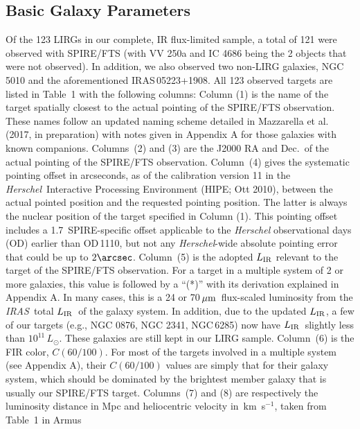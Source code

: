 \documentclass[preprint]{aastex}
\newcommand{\um}{\mbox{$\,\mu{\rm m}$}}
\newcommand{\kms}{\mbox{\,km~s$^{-1}$}}
\newcommand{\IRAS}{{\it IRAS}}
\newcommand{\Herschel}{{\it Herschel}}
\newcommand{\LIR}{\mbox{$L_{\rm IR}$}}
\begin{document}
\subsection{Basic Galaxy Parameters} \label{sec2.2}

Of the 123 LIRGs in our complete, IR flux-limited sample,  a total of 121 were observed 
with SPIRE/FTS (with VV 250a and IC 4686 being the 2 objects that were not observed).  
In addition, we 
also observed two non-LIRG galaxies, NGC\,5010 and the aforementioned IRAS\,05223+1908.
All 123 observed targets are listed in Table~1 with the following columns:  
Column (1) is the name of the target spatially closest to the actual pointing 
of the SPIRE/FTS observation.  These names follow an updated naming scheme detailed 
in Mazzarella et al. (2017, in preparation) with notes given in Appendix A for 
those galaxies with known companions.  Columns~(2) and (3) are the J2000 RA and 
Dec.~of the actual pointing of 
the SPIRE/FTS observation.  Column~(4) gives the systematic pointing offset 
in arcseconds, as of the calibration version 11 in the \Herschel\ Interactive Processing 
Environment (HIPE; Ott 2010), between the actual pointed position and the requested 
pointing position.  The latter is always the nuclear 
position of the target specified in Column (1).  This pointing offset includes 
a 1.7\arcsec\ SPIRE-specific offset applicable to the {\it Herschel} observational 
days (OD) earlier than OD\,1110,
but not any {\it Herschel}-wide absolute pointing error that could be up 
to $2\arcsec$.    Column~(5) is the adopted $L_{\rm IR}$ relevant to the target
of the SPIRE/FTS observation.   For a target in a multiple system of 2 or more
galaxies, this value is followed by a ``(*)'' with its derivation explained in 
Appendix A.  In many cases, this is a 24 or 70\um\ flux-scaled luminosity from 
the \IRAS\ total \LIR\ of the galaxy system.  In addition, due to the updated 
\LIR,  a few of our targets (e.g., NGC 0876, NGC 2341, NGC\,6285) now have \LIR\ 
slightly less than $10^{11}\,L_{\odot}$. These galaxies are still kept in our LIRG 
sample.  Column~(6) is the FIR color, $C(60/100)$.  For most of the targets involved 
in a multiple system (see Appendix A), their $C(60/100)$ values are simply that for 
their galaxy system, which should be dominated by the brightest member galaxy that 
is usually our SPIRE/FTS target.  Columns~(7) and (8) are respectively the luminosity 
distance in Mpc and heliocentric velocity in \kms, taken from Table~1 in Armus 
\end{document}
